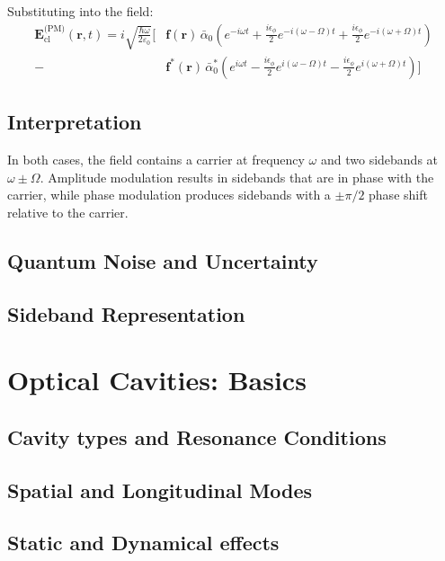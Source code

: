 Substituting into the field:
\begin{align}
    \mathbf{E}_{\text{cl}}^{\text{(PM)}}(\mathbf{r}, t) =
    i \sqrt{\frac{\hbar \omega}{2 \varepsilon_0}} \Big[
    &\mathbf{f}(\mathbf{r})\, \bar{\alpha}_0 \left( e^{-i\omega t} + \frac{i \epsilon_\phi}{2} e^{-i(\omega - \Omega)t} + \frac{i \epsilon_\phi}{2} e^{-i(\omega + \Omega)t} \right) \nonumber \\
    - &\mathbf{f}^*(\mathbf{r})\, \bar{\alpha}_0^* \left( e^{i\omega t} - \frac{i \epsilon_\phi}{2} e^{i(\omega - \Omega)t} - \frac{i \epsilon_\phi}{2} e^{i(\omega + \Omega)t} \right)
    \Big]
\end{align}

\subsection*{Interpretation}

In both cases, the field contains a carrier at frequency $\omega$ and two sidebands at $\omega \pm \Omega$. Amplitude modulation results in sidebands that are in phase with the carrier, while phase modulation produces sidebands with a $\pm \pi/2$ phase shift relative to the carrier.

\subsection{Quantum Noise and Uncertainty}
\subsection{Sideband Representation}
\hspace{1pt}

\section{Optical Cavities: Basics}
\subsection{Cavity types and Resonance Conditions}
\subsection{Spatial and Longitudinal Modes}
\subsection{Static and Dynamical effects}
\hspace{1pt}

